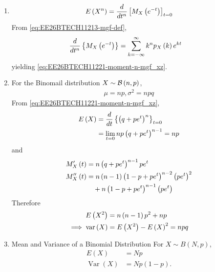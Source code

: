 \begin{enumerate}[label=\thesubsection.\arabic*,ref=\thesubsection.\theenumi]
where

\begin{align}
V_{\text{rms}}&=\frac{V_m}{\sqrt2}\\
I_{\text{rms}}&=\frac{I_m}{\sqrt2}\\
\theta&=\phi_v-\phi_i.
\end{align}

\item 
	\begin{align}
		E\left(X^n\right) = \frac{d}{dt^n}{}\left[M_X\left(e^{-t}\right)\right]_{t=0} 
\label{eq:EE26BTECH11221-moment-n-mgf_xz}
\end{align}
\solution
From 
\eqref{eq:EE26BTECH11213-mgf-def},
	\begin{align}
		\frac{d}{dt^n}\left\{M_X\left(e^{-t}\right)\right\} &= 
		\sum_{k=-\infty}^{\infty}k^np_X\left(k\right) e^{kt} 
\end{align}
yielding
\eqref{eq:EE26BTECH11221-moment-n-mgf_xz}.
	\item For the Binomail distribution $X \sim \mathcal{B}\left(n,p\right)$,
		\begin{align}
			\label{moment-mean-var}
			\mu = np, \sigma^2 = npq
		\end{align}
		\solution 
From 
\eqref{eq:EE26BTECH11221-moment-n-mgf_xz},
\begin{align}
	E\left(X\right)&=\frac{d}{dt}\left\{\left(q+pe^{t}\right)^n\right\}_{t=0} 
	\\
		 &= \lim_{t=0}np\left(q+pe^{t}\right)^{n-1}=np
\label{eq:EE26BTECH11221-binom-mean}
\end{align}
and
\begin{align}
	M_X^{\prime}\left(t\right) &= n\left(q + p e^t\right)^{n-1}pe^t
	\\
M_X^{\prime \prime}\left(t\right)
&= n\left(n-1\right)\left(1 - p + p e^t\right)^{n-2}\left(p e^t\right)^2 \\
&\quad + n\left(1 - p + p e^t\right)^{n-1}\left(p e^t\right)
\end{align}
Therefore
\begin{align}
	E\left(X^2\right)
&= n\left(n-1\right)p^2 + np
\\
	\implies \text{var}\left(X\right) &= 
	E\left(X^2\right)
-E\left(X\right)^2=
npq
\label{eq:EE26BTECH11221-binom-variance}
\end{align}

%
\item Mean and Variance of a Binomial Distribution
For $X\sim B(N,p)$,
\begin{align}
E(X)&=Np\\
\operatorname{Var}(X)&=Np(1-p). \label{variance}
\end{align}


\end{enumerate}
